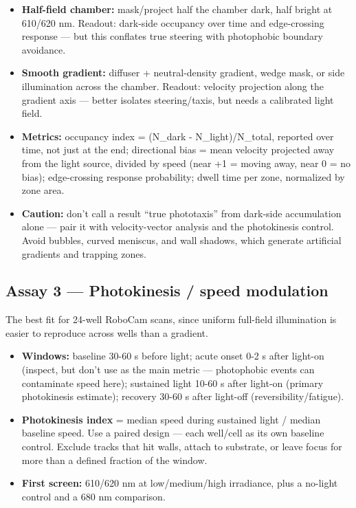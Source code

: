 \documentclass[
]{article}
\providecommand{\tightlist}{%
  \setlength{\itemsep}{0pt}\setlength{\parskip}{0pt}}
\begin{document}
\begin{itemize}
\tightlist
\item
  \textbf{Half-field chamber:} mask/project half the chamber dark, half
  bright at 610/620 nm. Readout: dark-side occupancy over time and
  edge-crossing response --- but this conflates true steering with
  photophobic boundary avoidance.
\item
  \textbf{Smooth gradient:} diffuser + neutral-density gradient, wedge
  mask, or side illumination across the chamber. Readout: velocity
  projection along the gradient axis --- better isolates steering/taxis,
  but needs a calibrated light field.
\item
  \textbf{Metrics:} occupancy index = (N\_dark - N\_light)/N\_total,
  reported over time, not just at the end; directional bias = mean
  velocity projected away from the light source, divided by speed (near
  +1 = moving away, near 0 = no bias); edge-crossing response
  probability; dwell time per zone, normalized by zone area.
\item
  \textbf{Caution:} don't call a result ``true phototaxis'' from
  dark-side accumulation alone --- pair it with velocity-vector analysis
  and the photokinesis control. Avoid bubbles, curved meniscus, and wall
  shadows, which generate artificial gradients and trapping zones.
\end{itemize}

\hypertarget{assay-3-photokinesis-speed-modulation}{%
\subsection{Assay 3 --- Photokinesis / speed
modulation}\label{assay-3-photokinesis-speed-modulation}}

The best fit for 24-well RoboCam scans, since uniform full-field
illumination is easier to reproduce across wells than a gradient.

\begin{itemize}
\tightlist
\item
  \textbf{Windows:} baseline 30-60 s before light; acute onset 0-2 s
  after light-on (inspect, but don't use as the main metric ---
  photophobic events can contaminate speed here); sustained light 10-60
  s after light-on (primary photokinesis estimate); recovery 30-60 s
  after light-off (reversibility/fatigue).
\item
  \textbf{Photokinesis index} = median speed during sustained light /
  median baseline speed. Use a paired design --- each well/cell as its
  own baseline control. Exclude tracks that hit walls, attach to
  substrate, or leave focus for more than a defined fraction of the
  window.
\item
  \textbf{First screen:} 610/620 nm at low/medium/high irradiance, plus
  a no-light control and a 680 nm comparison.
\end{itemize}
\end{document}
